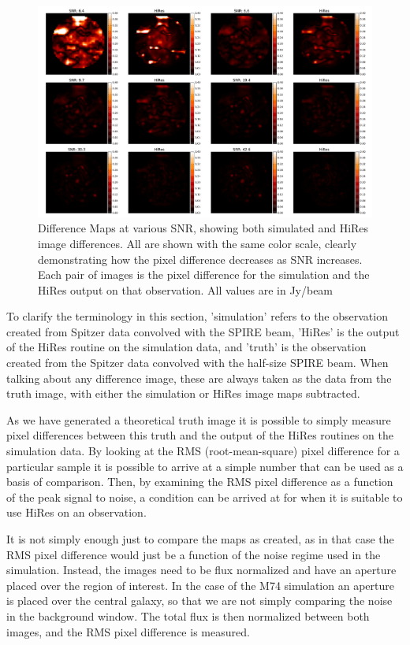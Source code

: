 \begin{figure}
    \centering
    \includegraphics[width=0.85\linewidth]{figures/diff_maps.pdf}
    \caption[Difference Maps]{Difference Maps at various SNR, showing both simulated and HiRes image differences. All are shown with the same color scale, clearly demonstrating how the pixel difference decreases as SNR increases. Each pair of images is the pixel difference for the simulation and the HiRes output on that observation. All values are in Jy/beam}
    \label{diffmaps}
\end{figure}

To clarify the terminology in this section, 'simulation' refers to the observation created from Spitzer data convolved with the SPIRE beam, 'HiRes' is the output of the HiRes routine on the simulation data, and 'truth' is the observation created from the Spitzer data convolved with the half-size SPIRE beam. When talking about any difference image, these are always taken as the data from the truth image, with either the simulation or HiRes image maps subtracted.

As we have generated a theoretical truth image it is possible to simply measure pixel differences between this truth and the output of the HiRes routines on the simulation data. By looking at the RMS (root-mean-square) pixel difference for a particular sample  it is possible to arrive at a simple number that can be used as a basis of comparison. Then, by examining the RMS pixel difference as a function of the peak signal to noise, a condition can be arrived at for when it is suitable to use HiRes on an observation.

It is not simply enough just to compare the maps as created, as in that case the RMS pixel difference would just be a function of the noise regime used in the simulation. Instead, the images need to be flux normalized and have an aperture placed over the region of interest. In the case of the M74 simulation an aperture is placed over the central galaxy, so that we are not simply comparing the noise in the background window. The total flux is then normalized between both images, and the RMS pixel difference is measured.

